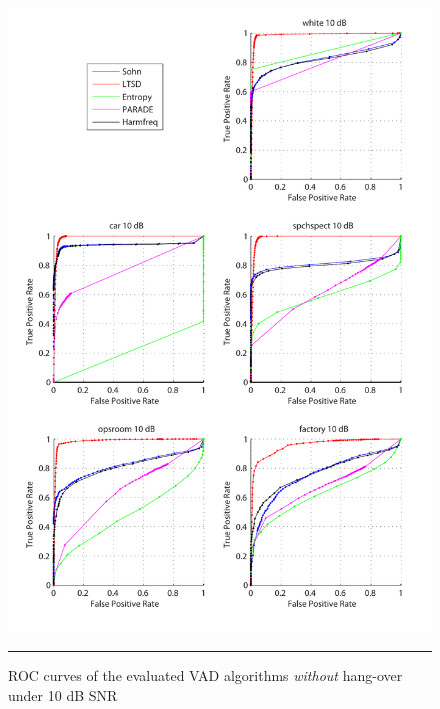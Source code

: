\begin{figure}[htbp]
	\centering
		\includegraphics[width=1.0\columnwidth]{Figures/Chapter3/10dBnoh.pdf}
		\rule{37em}{0.5pt}
	\caption[ROC curves of the evaluated algorithms \emph{without} hang-over under 10 dB SNR]{ROC curves of the evaluated VAD algorithms \emph{without} hang-over under 10 dB SNR}
	\label{fig:10dBnoh}
\end{figure}
